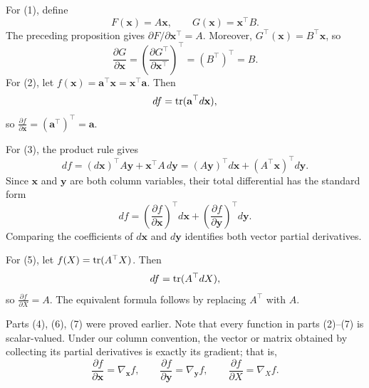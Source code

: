 \begin{pfbox}
For (1), define
\[
    F(\mathbf{x})=A\mathbf{x},
    \qquad
    G(\mathbf{x})=\mathbf{x}^{\top}B.
\]
The preceding proposition gives
$\partial F/\partial\mathbf{x}^{\top}=A$. Moreover,
$G^{\top}(\mathbf{x})=B^{\top}\mathbf{x}$, so
\[
    \frac{\partial G}{\partial\mathbf{x}}
    =
    \left(
        \frac{\partial G^{\top}}{\partial\mathbf{x}^{\top}}
    \right)^{\top}
    =(B^{\top})^{\top}
    =B.
\]
For (2), let
$f(\mathbf{x})=\mathbf{a}^{\top}\mathbf{x}=\mathbf{x}^{\top}\mathbf{a}$. Then
\[
    df=\operatorname{tr}(\mathbf{a}^{\top}d\mathbf{x}),
\]
so $\frac{\partial f}{\partial\mathbf{x}}
=(\mathbf{a}^{\top})^{\top}=\mathbf{a}$.

For (3), the product rule gives
\[
    df
    =
    (d\mathbf{x})^{\top}A\mathbf{y}
    +\mathbf{x}^{\top}A\,d\mathbf{y}
    =
    (A\mathbf{y})^{\top}d\mathbf{x}
    +(A^{\top}\mathbf{x})^{\top}d\mathbf{y}.
\]
Since $\mathbf{x}$ and $\mathbf{y}$ are both column variables, their total
differential has the standard form
\[
    df
    =
    \left(\frac{\partial f}{\partial\mathbf{x}}\right)^{\top}d\mathbf{x}
    +
    \left(\frac{\partial f}{\partial\mathbf{y}}\right)^{\top}d\mathbf{y}.
\]
Comparing the coefficients of $d\mathbf{x}$ and $d\mathbf{y}$ identifies both
vector partial derivatives. 

For (5), let $f(X)=\operatorname{tr}(A^{\top}X)$. Then
\[
    df=\operatorname{tr}(A^{\top}dX),
\]
so $\frac{\partial f}{\partial X}=A$. The equivalent formula follows by
replacing $A^{\top}$ with $A$.

Parts (4), (6), (7) were proved earlier.
Note that every function in parts (2)--(7) is scalar-valued. Under our column convention,
the vector or matrix obtained by collecting its partial derivatives is exactly
its gradient; that is,
\[
    \frac{\partial f}{\partial\mathbf{x}}=\nabla_{\mathbf{x}}f,
    \qquad
    \frac{\partial f}{\partial\mathbf{y}}=\nabla_{\mathbf{y}}f,
    \qquad
    \frac{\partial f}{\partial X}=\nabla_Xf.
\]
\end{pfbox}


